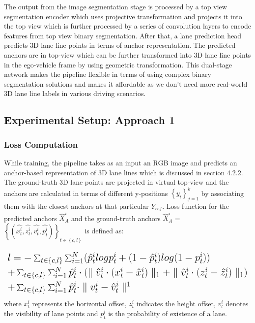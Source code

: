          The output from the image segmentation stage is processed by a top view segmentation encoder which uses projective transformation and projects it into the top view which is further processed by a series of convolution layers to encode features from top view binary segmentation. After that, a lane prediction head predicts 3D lane line points in terms of anchor representation. The predicted anchors are in top-view which can be further transformed into 3D lane line points in the ego-vehicle frame by using geometric transformation. This dual-stage network makes the pipeline flexible in terms of using complex binary segmentation solutions and makes it affordable as we don't need more real-world 3D lane line labels in various driving scenarios.
        
        
        \subsection{Experimental Setup: Approach 1}
        
        
            \subsubsection{Loss Computation}
            While training, the pipeline takes as an input an RGB image and predicts an anchor-based representation of 3D lane lines which is discussed in section 4.2.2. The ground-truth 3D lane points are projected in virtual top-view and the anchors are calculated in terms of different y-positions $\left\{ y_{i} \right\}^{k}_{j=1}$ by associating them with the closest anchors at that particular $Y_{ref}$. Loss function for the predicted anchors $\hat{X}_{A}^{i}$ and the ground-truth anchors $\hat{X}_{A}^{i}$ =$ \left\{(\hat{x^{i}_{t}},\hat{z^{i}_{t}},\hat{v^{i}_{t}},\hat{p^{i}_{t}})\right\}_{t\in\left\{c,l\right\}}     $ is defined as: 
            
            \begin{equation}%
\mbox{\fontsize{15}{21.6}\selectfont\( %
 \begin{array}{l}
                l = - \sum_{t\in\left\{c,l\right\}} \sum ^{N}_{i=1}(\hat{p}^{i}_{t} logp^{i}_{t} + (1-\hat{p}^{i}_{t})log(1-p^{i}_{t}) )   \\ 
                +  \sum_{t\in\left\{c,l\right\}} \sum ^{N}_{i=1}\hat{p}^{i}_{t}\cdot(\parallel \hat{v}^{i}_{t} \cdot (x^{i}_{t} - \hat{x}^{i}_{t}) \parallel_{1} + \parallel \hat{v}^{i}_{t} \cdot (z^{i}_{t} - \hat{z}^{i}_{t}) \parallel_{1} ) \\ 
                + \sum_{t\in\left\{c,l\right\}} \sum ^{N}_{i=1} \hat{p}^{i}_{t} \cdot \parallel v^{i}_{t} - \hat{v}^{i}_{t} \parallel^{1}
            \end{array} %
\)} %
\end{equation}
            where $x^{i}_{t}$ represents the horizontal offset, $z^{i}_{t}$ indicates the height offset, $v^{i}_{t}$ denotes the visibility of lane points and $p^{i}_{t}$ is the probability of existence of a lane.  
        
